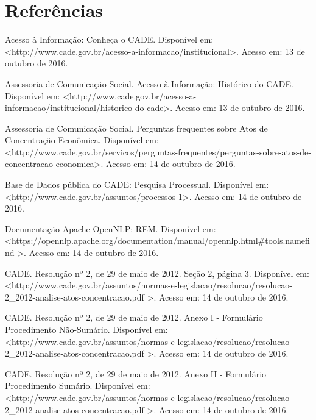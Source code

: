 \documentclass[11pt]{report}
\begin{document}
\pagebreak
\chapter*{Referências}

\begin{enumerate}[label={[\arabic*]}]
\item Acesso à Informação: Conheça o CADE. Disponível em: \textless\enspace http://www.cade.gov.br/acesso-a-informacao/institucional\enspace\textgreater. Acesso em: 13 de outubro de 2016.
\item Assessoria de Comunicação Social. Acesso à Informação: Histórico do CADE. Disponível em: \textless\enspace http://www.cade.gov.br/acesso-a-informacao/institucional/historico-do-cade\enspace\textgreater. Acesso em: 13 de outubro de 2016.
\item Assessoria de Comunicação Social. Perguntas frequentes sobre Atos de Concentração Econômica. Disponível em: \textless\enspace http://www.cade.gov.br/servicos/perguntas-frequentes/perguntas-sobre-atos-de-concentracao-economica\enspace\textgreater. Acesso em: 14 de outubro de 2016.
\item Base de Dados pública do CADE: Pesquisa Processual. Disponível em: \newline\textless\enspace http://www.cade.gov.br/assuntos/processos-1\enspace\textgreater. Acesso em: 14 de outubro de 2016.
\item Documentação Apache OpenNLP: REM. Disponível em: \newline\textless\enspace https://opennlp.apache.org/documentation/manual/opennlp.html\#tools.namefind \enspace\textgreater. Acesso em: 14 de outubro de 2016.
\item CADE. Resolução nº 2, de 29 de maio de 2012. Seção 2, página 3. Disponível em: \textless\enspace http://www.cade.gov.br/assuntos/normas-e-legislacao/resolucao/resolucao-2\_2012-analise-atos-concentracao.pdf \enspace\textgreater. Acesso em: 14 de outubro de 2016.
\item CADE. Resolução nº 2, de 29 de maio de 2012. Anexo I - Formulário Procedimento Não-Sumário. Disponível em: \newline\textless\enspace http://www.cade.gov.br/assuntos/normas-e-legislacao/resolucao/resolucao-2\_2012-analise-atos-concentracao.pdf \enspace\textgreater. Acesso em: 14 de outubro de 2016.
\item CADE. Resolução nº 2, de 29 de maio de 2012. Anexo II - Formulário Procedimento Sumário. Disponível em: \newline\textless\enspace http://www.cade.gov.br/assuntos/normas-e-legislacao/resolucao/resolucao-2\_2012-analise-atos-concentracao.pdf \enspace\textgreater. Acesso em: 14 de outubro de 2016.

\end{enumerate}
\end{document}
